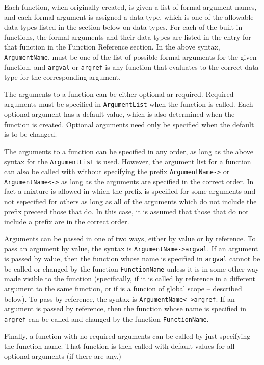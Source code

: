 Each function, when originally created, is given a list of formal
argument names, and each formal argument is assigned a data type,
which is one of the allowable data types listed in the section below
on data types.  For each of the built-in functions, the formal
arguments and their data types are listed in the entry for that
function in the Function Reference section.  In the above syntax,
\verb+ArgumentName+, must be one of the list of possible formal
arguments for the given function, and \verb+argval+ or \verb+argref+
is any function that evaluates to the correct data type for the
corresponding argument. 

The arguments to a function can be either optional ar required.
Required arguments must be specified in \verb+ArgumentList+ when the
function is called.  Each optional argument has a default value, which
is also determined when the function is created.  Optional arguments
need only be specified when the default is to be changed.

The arguments to a function can be specified in any order, as long as
the above syntax for the \verb+ArgumentList+ is used.  However, the
argument list for a function can also be called with without specifying
the prefix \verb+ArgumentName->+ or \verb+ArgumentName<->+ as long as
the arguments are specified in the correct order.  In fact a mixture
is allowed in which the prefix is specified for some arguments and not
sepecified for others as long as all of the arguments which do not
include the prefix preceed those that do.  In this case, it is assumed
that those that do not include a prefix are in the correct order.  

Arguments can be passed in one of two ways, either by value or by
reference.  To pass an argument by value, the syntax is
\verb+ArgumentName->argval+.  If an argument is passed by value, then the
function whose name is specified in \verb+argval+ cannot be be called
or changed by the function \verb+FunctionName+ unless it is in some
other way made visible to the function (specifically, if it is called
by reference in a different argument to the same function, or if is a
funcion of global scope -- described below).  To pass by reference,
the syntax is \verb+ArgumentName<->argref+.  If an argument is passed
by reference, then the function whose name is specified in
\verb+argref+ can be called and changed by the function
\verb+FunctionName+.  

Finally, a function with no required arguments can be called by just
specifying the function name.  That function is then called with
default values for all optional arguments (if there are any.)

